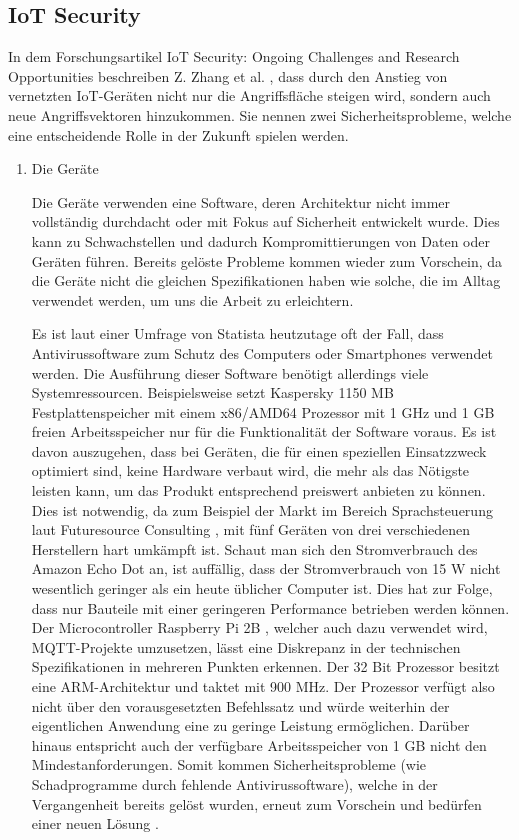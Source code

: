         \subsection{\ac{IoT} Security}
        In dem Forschungsartikel \glqq IoT Security: Ongoing Challenges and Research Opportunities\grqq{} beschreiben Z. Zhang et al. \cite{6978614}, dass durch den Anstieg von vernetzten \ac{IoT}-Geräten nicht nur die Angriffsfläche steigen wird, sondern auch neue Angriffsvektoren hinzukommen.
        Sie nennen zwei Sicherheitsprobleme, welche eine entscheidende Rolle in der Zukunft spielen werden.
        \begin{enumerate}
            \item Die Geräte
            
            Die Geräte verwenden eine Software, deren Architektur nicht immer vollständig durchdacht oder mit Fokus auf Sicherheit entwickelt wurde. Dies kann zu Schwachstellen und dadurch Kompromittierungen von Daten oder Geräten führen. Bereits gelöste Probleme kommen wieder zum Vorschein, da die Geräte nicht die gleichen Spezifikationen haben wie solche, die im Alltag verwendet werden, um uns die Arbeit zu erleichtern. 
        
            Es ist laut einer Umfrage von Statista \cite{kaspersky_lab_2019}
            heutzutage oft der Fall, dass Antivirussoftware zum Schutz des Computers oder Smartphones verwendet werden. Die Ausführung dieser Software benötigt allerdings viele Systemressourcen.
            Beispielsweise setzt Kaspersky \cite{ao_kaspersky_lab_2018_1}
            1150 MB Festplattenspeicher mit einem x86/AMD64 Prozessor mit 1 GHz und 1 GB freien Arbeitsspeicher nur für die Funktionalität der Software voraus. Es ist davon auszugehen, dass bei Geräten, die für einen speziellen Einsatzzweck optimiert sind, keine Hardware verbaut wird, die mehr als das Nötigste leisten kann, um das Produkt entsprechend preiswert anbieten zu können. Dies ist notwendig, da zum Beispiel der Markt im Bereich Sprachsteuerung laut Futuresource Consulting \cite{futuresource_consulting_ltd_2019}, mit fünf Geräten von drei verschiedenen Herstellern hart umkämpft ist. Schaut man sich den Stromverbrauch des Amazon Echo Dot \cite{amazon_de_alle_produkte_2018} an, ist auffällig, dass der Stromverbrauch von 15 W nicht wesentlich geringer als ein heute üblicher Computer ist. Dies hat zur Folge, dass nur Bauteile mit einer geringeren Performance betrieben werden können.
            Der Microcontroller Raspberry Pi 2B \cite{raspberry_pi_foundation_2016}, welcher auch dazu verwendet wird, \ac{MQTT}-Projekte umzusetzen, lässt eine Diskrepanz in der technischen Spezifikationen in mehreren Punkten erkennen. Der 32 Bit Prozessor besitzt eine \ac{ARM}-Architektur und taktet mit 900 MHz. Der Prozessor verfügt also nicht über den vorausgesetzten Befehlssatz und würde weiterhin der eigentlichen Anwendung eine zu geringe Leistung ermöglichen. Darüber hinaus entspricht auch der verfügbare Arbeitsspeicher von 1 GB nicht den Mindestanforderungen.
            Somit kommen Sicherheitsprobleme (wie Schadprogramme durch fehlende Antivirussoftware), welche in der Vergangenheit bereits gelöst wurden, erneut zum Vorschein und bedürfen einer neuen Lösung \cite{6978614}.
            

\end{enumerate}
